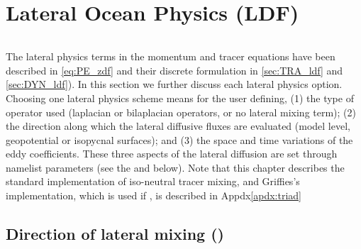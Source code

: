 \documentclass[../tex_main/NEMO_manual]{subfiles}
\begin{document}
\chapter{Lateral Ocean Physics (LDF)}
\label{chap:LDF}
\minitoc


\newpage
$\ $\newline    %


The lateral physics terms in the momentum and tracer equations have been described in \autoref{eq:PE_zdf} and
their discrete formulation in \autoref{sec:TRA_ldf} and \autoref{sec:DYN_ldf}).
In this section we further discuss each lateral physics option.
Choosing one lateral physics scheme means for the user defining,
(1) the type of operator used (laplacian or bilaplacian operators, or no lateral mixing term);
(2) the direction along which the lateral diffusive fluxes are evaluated
(model level, geopotential or isopycnal surfaces); and
(3) the space and time variations of the eddy coefficients.
These three aspects of the lateral diffusion are set through namelist parameters
(see the \textit{} and \textit{} below).
Note that this chapter describes the standard implementation of iso-neutral tracer mixing,
and Griffies's implementation, which is used if ,
is described in Appdx\autoref{apdx:triad}





\section{Direction of lateral mixing (\protect{})}
\label{sec:LDF_slp}

\end{document}
